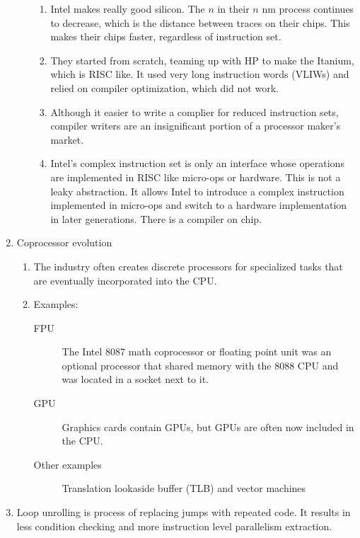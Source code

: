 \documentclass[twoside]{article}
\begin{document}
\begin{enumerate}
\begin{enumerate}
\begin{enumerate}
					\item Intel makes really good silicon. The $n$ in their $n$ nm process continues
						to decrease, which is the distance between traces on their chips. This makes
						their chips faster, regardless of instruction set.
					\item They started from scratch, teaming up with HP to make the Itanium, which is
						RISC like. It used very long instruction words (VLIWs) and relied on compiler
						optimization, which did not work.
					\item Although it easier to write a complier for reduced instruction sets, compiler
						writers are an insignificant portion of a processor maker's market.
					\item Intel's complex instruction set is only an interface whose operations are
						implemented in RISC like micro-ops or hardware. This is not a leaky abstraction.
						It allows Intel to introduce a complex instruction implemented in micro-ops
						and switch to a hardware implementation in later generations. There is a compiler
						on chip.
				\end{enumerate}
		\end{enumerate}
	\item Coprocessor evolution
		\begin{enumerate}
			\item The industry often creates discrete processors for specialized tasks that are eventually
				incorporated into the CPU.
			\item Examples:
				\begin{description}
					\item[FPU] The Intel 8087 math coprocessor or floating point unit was an optional processor
						that shared memory with the 8088 CPU and was located in a socket next to it.
					\item[GPU] Graphics cards contain GPUs, but GPUs are often now included in the CPU.
					\item[Other examples] Translation lookaside buffer (TLB) and vector machines
				\end{description}
		\end{enumerate}
	\item Loop unrolling is process of replacing jumps with repeated code. It results in less
		condition checking and more instruction level parallelism extraction.
\end{enumerate}
\end{document}
